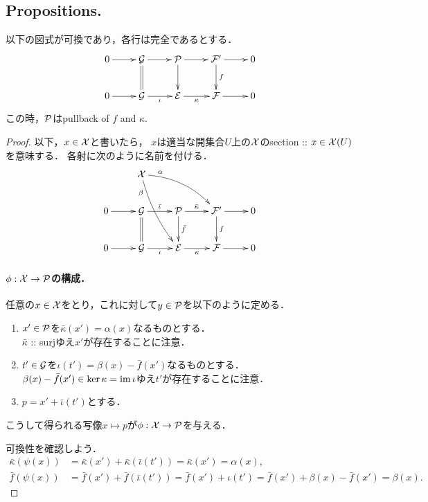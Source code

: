 \documentclass[a4paper]{jsarticle}
\begin{document}
    \subsection{Propositions.}
    \begin{Lemma}\label{lemma:two_exact_seq_raise_pb}
        以下の図式が可換であり，各行は完全であるとする．
        \[\vcenter{\xymatrix{
            0 \ar[r]& \shG \ar@{=}[d]\ar[r]& \shP \ar[d]\ar[r]& \shF' \ar[d]^-{f}\ar[r]& 0 \\
            0 \ar[r]& \shG \ar[r]_-{\iota}& \shE \ar[r]_-{\kappa}& \shF \ar[r]& 0
        }}\]
        この時，$\mathcal{P}$はpullback of $f$ and $\kappa$.
    \end{Lemma}
    \begin{proof}
        以下，$x \in \mathcal{X}$と書いたら，
        $x$は適当な開集合$U$上の$\mathcal{X}$のsection :: $x \in \mathcal{X}(U)$を意味する．
        各射に次のように名前を付ける．
        \[\vcenter{\xymatrix{
            {} & \shX \ar@/^10pt/[rrd]^(.2){\alpha}\ar@/_5pt/[rdd]_(.2){\beta}& {} & {} & {} \\
            0 \ar[r]& \shG \ar@{=}[d]\ar[r]^-{\bar{\iota}}& \shP \ar[d]^-{\bar{f}}\ar[r]^-{\bar{\kappa}}& \shF' \ar[d]^-{f}\ar[r]& 0 \\
            0 \ar[r]& \shG \ar[r]_-{\iota}& \shE \ar[r]_-{\kappa}& \shF \ar[r]& 0
        }}\]

        \paragraph{$\phi: \mathcal{X} \to \mathcal{P}$の構成．}
        任意の$x \in \mathcal{X}$をとり，これに対して$y \in \mathcal{P}$を以下のように定める．
        \begin{enumerate}[labelindent=1cm, leftmargin=*]
            \item $x' \in \mathcal{P}$を$\bar{\kappa}(x')=\alpha(x)$なるものとする．\mbox{} \\
                  $\bar{\kappa}$ :: surjゆえ$x'$が存在することに注意．
            \item $t' \in \mathcal{G}$を$\iota(t')=\beta(x)-\bar{f}(x')$なるものとする． \mbox{} \\
                  $\beta(x)-\bar{f}(x')\in \ker \kappa=\operatorname{im} \iota$ゆえ$t'$が存在することに注意．
            \item $p=x'+\bar{\iota}(t')$とする．
        \end{enumerate}
        こうして得られる写像$x \mapsto p$が$\phi: \mathcal{X} \to \mathcal{P}$を与える．

        可換性を確認しよう．
        \begin{align*}
            \bar{\kappa}(\psi(x))&=\bar{\kappa}(x')+\bar{\kappa}(\bar{\iota}(t'))=\bar{\kappa}(x')=\alpha(x), \\
            \bar{f}(\psi(x))&=\bar{f}(x')+\bar{f}(\bar{\iota}(t'))
                =\bar{f}(x')+\iota(t')=\bar{f}(x')+\beta(x)-\bar{f}(x')=\beta(x).
        \end{align*}


\end{proof}
\end{document}
